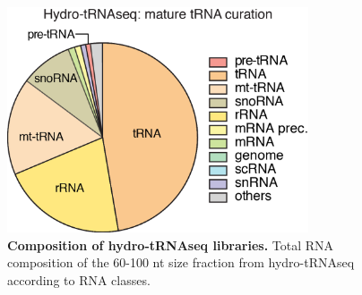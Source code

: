 \documentclass[12pt]{rockefeller}
\begin{document}
\begin{figure}[!ht]%
\centering
\includegraphics[width=3.5in]{paper2a.png}%
\caption[Composition of hydro-tRNAseq libraries]{\textbf{Composition of hydro-tRNAseq libraries.} Total RNA composition of the 60-100 nt size fraction from hydro-tRNAseq according to RNA classes.}
\centering
\label{paper2a}%
\end{figure}







\renewcommand{\bibname}{References}
%
\printbibliography
{} %
\end{document}
